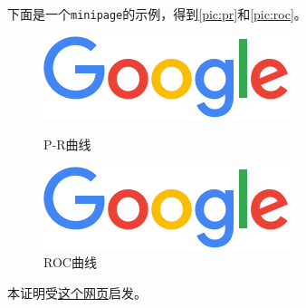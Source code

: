 \documentclass{dreamClass}
\begin{document}
下面是一个\texttt{minipage}的示例，得到\autoref{pic:pr}和\autoref{pic:roc}。
\begin{figure}
    \centering
    \begin{minipage}{.5\textwidth}
        \centering
        \includegraphics[width = \textwidth]{pic/screenshot.jpg}
        \caption{P-R曲线\label{pic:pr}}
    \end{minipage}%
    \begin{minipage}{.5\textwidth}
        \centering
        \includegraphics[width = \textwidth]{pic/screenshot.jpg}
        \caption{ROC曲线\label{pic:roc}}
    \end{minipage}
\end{figure}

本证明受\href{https://datawhalechina.github.io/pumpkin-book/#/chapter2/chapter2?id=221}{这个网页}启发。
\end{document}
